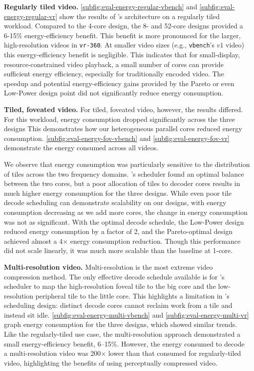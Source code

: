 \textbf{Regularly tiled video. } \ref{subfig:eval-energy-regular-vbench} and \ref{subfig:eval-energy-regular-vr} show the results of \nameArch's architecture on a regularly tiled workload.
Compared to the 4-core design, the 8- and 52-core designs provided a 6-15\% energy-efficiency benefit.
This benefit is more pronounced for the larger, high-resolution videos in \texttt{vr-360}.
At smaller video sizes (e.g., \texttt{vbench}'s $v1$ video) this energy-efficiency benefit is negligible.
This indicates that for small-display, resource-constrained video playback, a small number of cores can provide sufficient energy efficiency, especially for traditionally encoded video.
The speedup and potential energy-efficiency gains provided by the Pareto or even Low-Power design point did not significantly reduce energy consumption.

\textbf{Tiled, foveated video.} For tiled, foveated video, however, the results differed.
For this workload, energy consumption dropped significantly across the three designs
This demonstrates how our heterogeneous parallel cores reduced energy consumption.
\ref{subfig:eval-energy-fov-vbench} and \ref{subfig:eval-energy-fov-vr} demonstrate the energy consumed across all videos.

We observe that energy consumption was particularly sensitive to the distribution of tiles across the two frequency domains.
\nameArch's scheduler found an optimal balance between the two cores, but a poor allocation of tiles to decoder cores results in much higher energy consumption for the three \nameArch designs.
While even poor tile decode scheduling can demonstrate scalability on our designs, with energy consumption decreasing as we add more cores, the change in energy consumption was not as significant.
With the optimal decode schedule, the Low-Power design reduced energy consumption by a factor of 2, and the Pareto-optimal design achieved almost a 4$\times$ energy consumption reduction.
Though this performance did not scale linearly, it was much more scalable than the baseline at 1-core.

\textbf{Multi-resolution video. }Multi-resolution is the most extreme video compression method.
The only effective decode schedule available is for \nameArch's scheduler to map the high-resolution foveal tile to the big core and the low-resolution peripheral tile to the little core.
This highlights a limitation in \nameArch's scheduling design: distinct decode cores cannot reclaim work from a tile and instead sit idle.
\ref{subfig:eval-energy-multi-vbench} and \ref{subfig:eval-energy-multi-vr} graph energy consumption for the three designs, which showed similar trends.
Like the regularly-tiled use case, the multi-resolution approach demonstrated a small energy-efficiency benefit, 6--15\%.
However, the energy consumed to decode a multi-resolution video was 200$\times$ lower than that consumed for regularly-tiled video, highlighting the benefits of using perceptually compressed video.
